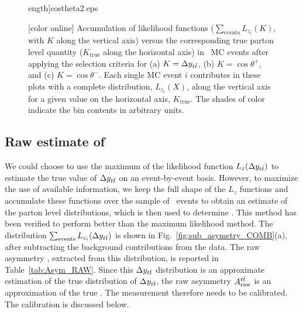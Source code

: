 \documentclass[aps,prd,twocolumn,showpacs,superscriptaddress,groupedaddress,floatfix]{revtex4}
\begin{document}
\begin{figure}[!ht]
ength]{costheta2.eps}

\caption{\label{Fig:fig_2D_likelihood}
 [color online] Accumulation of likelihood functions ($\sum_{\text{events}} L_{z_i}(K)$, with $K$ along the vertical axis) versus the corresponding true parton level quantity ($K_{\mathrm{true}}$ along the horizontal axis) in \ttbar\ MC events after applying the selection criteria
for 
(a) $K=\Delta y_{t\bar{t}}$, (b) $K=\cos\theta^+$, and (c) $K=\cos\theta^-$.
Each single MC event $i$ contributes in these plots with a complete distribution, $L_{z_i}(X)$, along the vertical axis for a given value on the horizontal axis, $K_{\mathrm{true}}$. The shades of color indicate the bin contents in arbitrary units.}
\end{figure}




\subsection{Raw estimate of \Att}
\label{sec:attraw_definition}
We could choose to use the maximum of the likelihood function $L_z(\Delta y_{t\bar{t}})$
to estimate the true value of $\Delta y_{t\bar{t}}$ on an event-by-event basis.
However, to maximize the use of available information, we keep the full shape
 of the $L_z$ functions and accumulate these functions over the sample of \ttbar\ events to  obtain an estimate of the parton level distributions, which is then used to determine \Att. 
This method has been verified to perform better than the maximum likelihood method.
The distribution  $ \sum_{\text{events}} L_{z_i}(\Delta y_{t\bar{t}})$ is  shown
in Fig.~\ref{fig:sub_asymetry_COMB}(a), after subtracting the background contributions from the data.
The raw asymmetry \Attraw, extracted from this distribution, is reported in Table~\ref{tab:Asym_RAW}. Since this $\Delta y_{t\bar{t}}$ distribution
is an approximate estimation  of the true distribution of $\Delta y_{t\bar{t}}$,
 the raw asymmetry  $A^{t\bar t}_{\rm raw}$  is an approximation of the true \Att. The measurement therefore needs to be calibrated. The calibration is discussed below.
\end{document}
